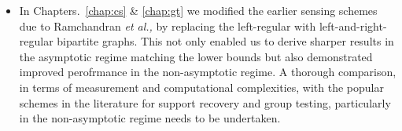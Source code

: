 \begin{itemize}
\item In Chapters.~\ref{chap:cs} \& \ref{chap:gt} we modified the earlier sensing schemes due to Ramchandran \textit{et al.,} by replacing the left-regular with left-and-right-regular bipartite graphs. This not only enabled us to derive sharper results in the asymptotic regime matching the lower bounds but also demonstrated improved perofrmance in the non-asymptotic regime. A thorough comparison, in terms of measurement and computational complexities, with the popular schemes in the literature for support recovery and group testing, particularly in the non-asymptotic regime needs to be undertaken.
\end{itemize}
